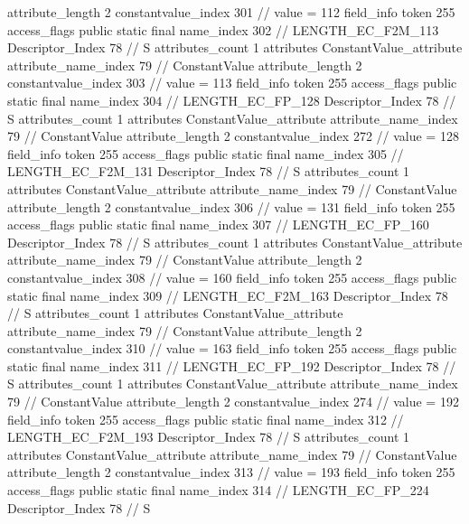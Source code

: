 {{{{{{{					attribute_length	2
					constantvalue_index	301		// value = 112
				}
				}
			}
			field_info {
				token	255
				access_flags	public static final
				name_index	302		// LENGTH_EC_F2M_113
				Descriptor_Index	78		// S
				attributes_count	1
				attributes {
				ConstantValue_attribute {
					attribute_name_index	79		// ConstantValue
					attribute_length	2
					constantvalue_index	303		// value = 113
				}
				}
			}
			field_info {
				token	255
				access_flags	public static final
				name_index	304		// LENGTH_EC_FP_128
				Descriptor_Index	78		// S
				attributes_count	1
				attributes {
				ConstantValue_attribute {
					attribute_name_index	79		// ConstantValue
					attribute_length	2
					constantvalue_index	272		// value = 128
				}
				}
			}
			field_info {
				token	255
				access_flags	public static final
				name_index	305		// LENGTH_EC_F2M_131
				Descriptor_Index	78		// S
				attributes_count	1
				attributes {
				ConstantValue_attribute {
					attribute_name_index	79		// ConstantValue
					attribute_length	2
					constantvalue_index	306		// value = 131
				}
				}
			}
			field_info {
				token	255
				access_flags	public static final
				name_index	307		// LENGTH_EC_FP_160
				Descriptor_Index	78		// S
				attributes_count	1
				attributes {
				ConstantValue_attribute {
					attribute_name_index	79		// ConstantValue
					attribute_length	2
					constantvalue_index	308		// value = 160
				}
				}
			}
			field_info {
				token	255
				access_flags	public static final
				name_index	309		// LENGTH_EC_F2M_163
				Descriptor_Index	78		// S
				attributes_count	1
				attributes {
				ConstantValue_attribute {
					attribute_name_index	79		// ConstantValue
					attribute_length	2
					constantvalue_index	310		// value = 163
				}
				}
			}
			field_info {
				token	255
				access_flags	public static final
				name_index	311		// LENGTH_EC_FP_192
				Descriptor_Index	78		// S
				attributes_count	1
				attributes {
				ConstantValue_attribute {
					attribute_name_index	79		// ConstantValue
					attribute_length	2
					constantvalue_index	274		// value = 192
				}
				}
			}
			field_info {
				token	255
				access_flags	public static final
				name_index	312		// LENGTH_EC_F2M_193
				Descriptor_Index	78		// S
				attributes_count	1
				attributes {
				ConstantValue_attribute {
					attribute_name_index	79		// ConstantValue
					attribute_length	2
					constantvalue_index	313		// value = 193
				}
				}
			}
			field_info {
				token	255
				access_flags	public static final
				name_index	314		// LENGTH_EC_FP_224
				Descriptor_Index	78		// S
}}}}}
